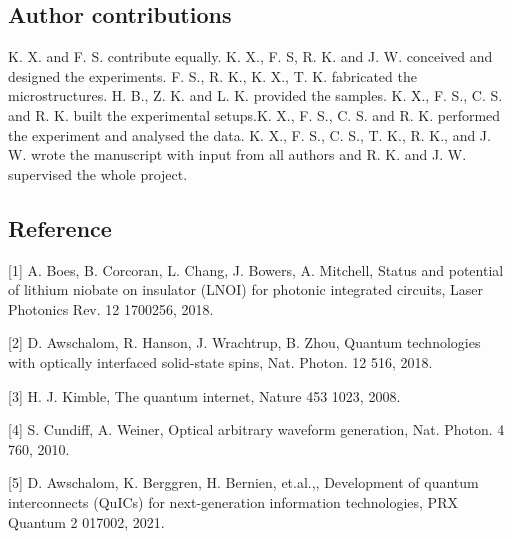 \documentclass[prl,reprint,superscriptaddress]{revtex4-1}
\begin{document}
\subsection{Author contributions}
K. X. and F. S. contribute equally. K. X., F. S, R. K. and J. W. conceived and designed the experiments. F. S., R. K., K. X., T. K. fabricated the microstructures. H. B., Z. K. and L. K. provided the samples. K. X., F. S., C. S. and R. K. built the experimental setups.K. X., F. S., C. S. and R. K. performed the experiment and analysed the data. K. X., F. S., C. S., T. K., R. K., and J. W. wrote the manuscript with input from all authors and R. K. and J. W. supervised the whole project.






\subsection{Reference}
[1]          A. Boes, B. Corcoran, L. Chang, J. Bowers, A. Mitchell, Status and potential of lithium niobate on insulator (LNOI) for photonic integrated circuits, Laser Photonics Rev. 12 1700256, 2018. 

[2] 	D. Awschalom, R. Hanson, J. Wrachtrup, B. Zhou, Quantum technologies with optically interfaced solid-state spins, Nat. Photon. 12 516, 2018. 

[3] 	H. J. Kimble, The quantum internet, Nature 453 1023, 2008.\

[4] 	S. Cundiff, A. Weiner, Optical arbitrary waveform generation, Nat. Photon. 4 760, 2010. 

[5] 	D. Awschalom, K. Berggren, H. Bernien, et.al.,, Development of quantum interconnects (QuICs) for next-generation information technologies, PRX Quantum 2 017002, 2021. 
\end{document}
